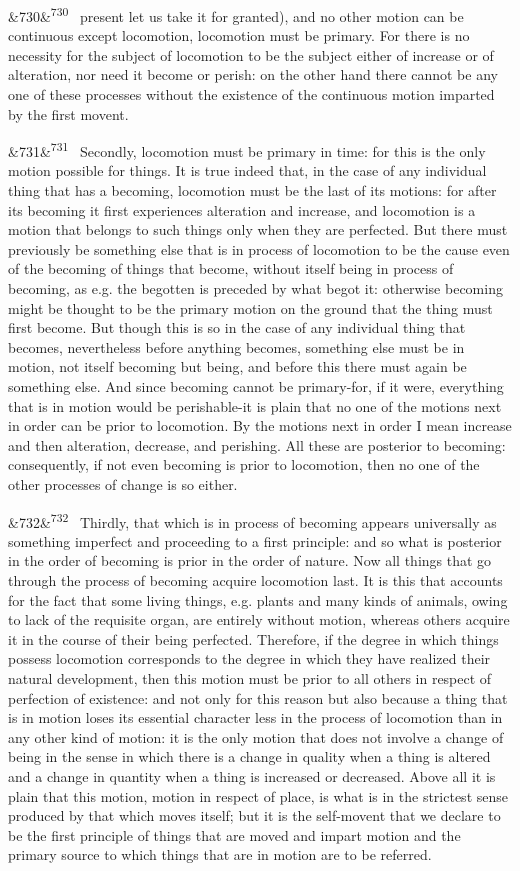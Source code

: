 \documentclass[12pt]{article}
\newcommand{\para}[1][]{\par\noindent\ifx&#1&\else\textsuperscript{\footnotesize #1}~\fi}
\begin{document}
\para[730] present let us take it for granted), and no other motion can be continuous except locomotion, locomotion must be primary. For there is no necessity for the subject of locomotion to be the subject either of increase or of alteration, nor need it become or perish: on the other hand there cannot be any one of these processes without the existence of the continuous motion imparted by the first movent.

\para[731] Secondly, locomotion must be primary in time: for this is the only motion possible for things. It is true indeed that, in the case of any individual thing that has a becoming, locomotion must be the last of its motions: for after its becoming it first experiences alteration and increase, and locomotion is a motion that belongs to such things only when they are perfected. But there must previously be something else that is in process of locomotion to be the cause even of the becoming of things that become, without itself being in process of becoming, as e.g. the begotten is preceded by what begot it: otherwise becoming might be thought to be the primary motion on the ground that the thing must first become. But though this is so in the case of any individual thing that becomes, nevertheless before anything becomes, something else must be in motion, not itself becoming but being, and before this there must again be something else. And since becoming cannot be primary-for, if it were, everything that is in motion would be perishable-it is plain that no one of the motions next in order can be prior to locomotion. By the motions next in order I mean increase and then alteration, decrease, and perishing. All these are posterior to becoming: consequently, if not even becoming is prior to locomotion, then no one of the other processes of change is so either.

\para[732] Thirdly, that which is in process of becoming appears universally as something imperfect and proceeding to a first principle: and so what is posterior in the order of becoming is prior in the order of nature. Now all things that go through the process of becoming acquire locomotion last. It is this that accounts for the fact that some living things, e.g. plants and many kinds of animals, owing to lack of the requisite organ, are entirely without motion, whereas others acquire it in the course of their being perfected. Therefore, if the degree in which things possess locomotion corresponds to the degree in which they have realized their natural development, then this motion must be prior to all others in respect of perfection of existence: and not only for this reason but also because a thing that is in motion loses its essential character less in the process of locomotion than in any other kind of motion: it is the only motion that does not involve a change of being in the sense in which there is a change in quality when a thing is altered and a change in quantity when a thing is increased or decreased. Above all it is plain that this motion, motion in respect of place, is what is in the strictest sense produced by that which moves itself; but it is the self-movent that we declare to be the first principle of things that are moved and impart motion and the primary source to which things that are in motion are to be referred.
\end{document}
